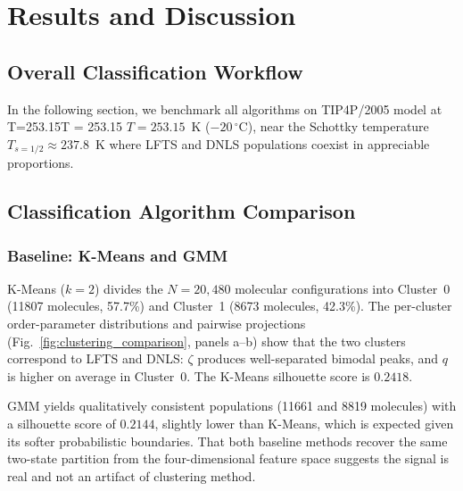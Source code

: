\documentclass[aps, amsmath,amssymb, reprint, twocolumn, superscriptaddress]{revtex4-1}
\begin{document}
\FloatBarrier



\section{Results and Discussion}

\subsection{Overall Classification Workflow}

In the following section, we benchmark all algorithms on TIP4P/2005 model at T=253.15T = 253.15 $T = 253.15$~K ($-20\,^\circ$C), near the Schottky temperature $T_{s=1/2} \approx 237.8$~K where LFTS and DNLS populations coexist in appreciable proportions.

\subsection{Classification Algorithm Comparison}

\subsubsection{Baseline: K-Means and GMM}

K-Means ($k=2$) divides the $N = 20{,}480$ molecular configurations into Cluster~0 (11807 molecules, 57.7\%) and Cluster~1 (8673 molecules, 42.3\%). The per-cluster order-parameter distributions and pairwise projections (Fig.~\ref{fig:clustering_comparison}, panels a--b) show that the two clusters correspond to LFTS and DNLS: $\zeta$ produces well-separated bimodal peaks, and $q$ is higher on average in Cluster~0. The K-Means silhouette score is $0.2418$.

GMM yields qualitatively consistent populations (11661 and 8819 molecules) with a silhouette score of $0.2144$, slightly lower than K-Means, which is expected given its softer probabilistic boundaries. That both baseline methods recover the same two-state partition from the four-dimensional feature space suggests the signal is real and not an artifact of clustering method.\label{app:gmm}


\end{document}
